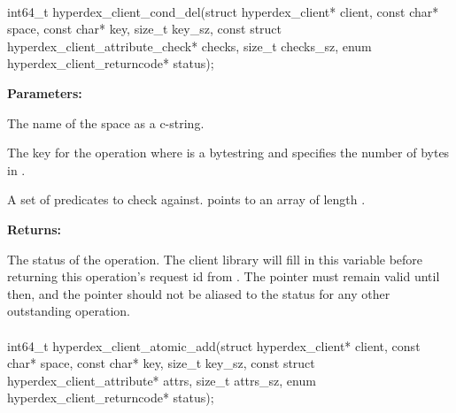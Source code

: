 \paragraph{}
\label{api:c:cond_del}
\begin{ccode}
int64_t hyperdex_client_cond_del(struct hyperdex_client* client,
        const char* space,
        const char* key, size_t key_sz,
        const struct hyperdex_client_attribute_check* checks, size_t checks_sz,
        enum hyperdex_client_returncode* status);
\end{ccode}
\funcdesc 

\noindent\textbf{Parameters:}
\begin{description}[labelindent=\widthof{{\code{checks}, \code{checks\_sz}}},leftmargin=*,noitemsep,nolistsep,align=right]
\item[\code{space}] The name of the space as a c-string.
\item[\code{key}, \code{key\_sz}] The key for the operation where  is a bytestring and  specifies the number of bytes in .
\item[\code{checks}, \code{checks\_sz}] A set of predicates to check against.   points to an array of length .
\end{description}

\noindent\textbf{Returns:}
\begin{description}[labelindent=\widthof{{\code{status}}},leftmargin=*,noitemsep,nolistsep,align=right]
\item[\code{status}] The status of the operation.  The client library will fill in this variable before returning this operation's request id from .  The pointer must remain valid until then, and the pointer should not be aliased to the status for any other outstanding operation.
\end{description}

\paragraph{}
\label{api:c:atomic_add}
\begin{ccode}
int64_t hyperdex_client_atomic_add(struct hyperdex_client* client,
        const char* space,
        const char* key, size_t key_sz,
        const struct hyperdex_client_attribute* attrs, size_t attrs_sz,
        enum hyperdex_client_returncode* status);
\end{ccode}
\funcdesc 

